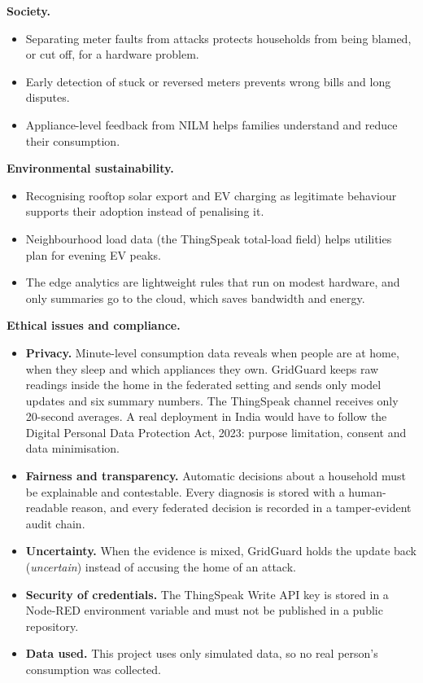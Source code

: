 \documentclass[12pt,a4paper,oneside]{report}
\begin{document}
\textbf{Society.}
\begin{itemize}
\item Separating meter faults from attacks protects households from being blamed, or cut off, for a hardware problem.
\item Early detection of stuck or reversed meters prevents wrong bills and long disputes.
\item Appliance-level feedback from NILM helps families understand and reduce their consumption.
\end{itemize}

\textbf{Environmental sustainability.}
\begin{itemize}
\item Recognising rooftop solar export and EV charging as legitimate behaviour supports their adoption instead of penalising it.
\item Neighbourhood load data (the ThingSpeak total-load field) helps utilities plan for evening EV peaks.
\item The edge analytics are lightweight rules that run on modest hardware, and only summaries go to the cloud, which saves bandwidth and energy.
\end{itemize}

\textbf{Ethical issues and compliance.}
\begin{itemize}
\item \textbf{Privacy.} Minute-level consumption data reveals when people are at home, when they sleep and which appliances they own. GridGuard keeps raw readings inside the home in the federated setting and sends only model updates and six summary numbers. The ThingSpeak channel receives only 20-second averages. A real deployment in India would have to follow the Digital Personal Data Protection Act, 2023: purpose limitation, consent and data minimisation.
\item \textbf{Fairness and transparency.} Automatic decisions about a household must be explainable and contestable. Every diagnosis is stored with a human-readable reason, and every federated decision is recorded in a tamper-evident audit chain.
\item \textbf{Uncertainty.} When the evidence is mixed, GridGuard holds the update back (\emph{uncertain}) instead of accusing the home of an attack.
\item \textbf{Security of credentials.} The ThingSpeak Write API key is stored in a Node-RED environment variable and must not be published in a public repository.
\item \textbf{Data used.} This project uses only simulated data, so no real person's consumption was collected.
\end{itemize}
\end{document}
